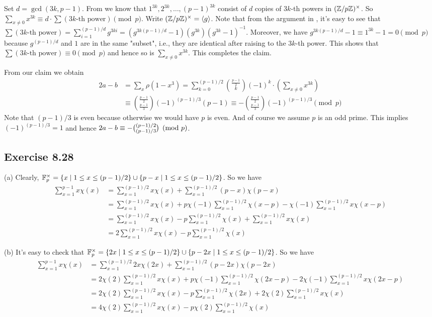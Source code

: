 \documentclass[../I&R.tex]{subfiles}
\begin{document}
Set $d=\gcd(3k,p-1)$. From  we know that $1^{3k},2^{3k},\ldots,(p-1)^{3k}$ consist of $d$ copies of $3k$-th powers in $(\mathbb{Z}/p\mathbb{Z})^\times$. So $\sum_{x\neq0} x^{3k}\equiv d\cdot\sum (3k\text{-th power}) \pmod{p}$. Write $(\mathbb{Z}/p\mathbb{Z})^\times=\langle g\rangle$. Note that from the argument in , it's easy to see that $\sum (3k\text{-th power}) = \sum_{i=1}^{(p-1)/d} g^{3ki} = (g^{3k(p-1)/d}-1)(g^{3k})(g^{3k}-1)^{-1}$. Moreover, we have $g^{3k(p-1)/d}-1\equiv 1^{3k}-1=0\pmod{p}$ because $g^{(p-1)/d}$ and $1$ are in the same "subset", i.e., they are identical after raising to the $3k$-th power. This shows that $\sum (3k\text{-th power}) \equiv0\pmod{p}$ and hence so is $\sum_{x\neq0} x^{3k}$. This completes the claim.

From our claim we obtain
\begin{align*}
    2a-b &= \sum_x \rho(1-x^3) = \sum_{k=0}^{(p-1)/2}\binom{\frac{p-1}{2}}{k}(-1)^k\cdot\left(\sum_{x\neq0} x^{3k}\right) \\
    &\equiv \binom{\frac{p-1}{2}}{\frac{p-1}{3}}(-1)^{(p-1)/3}(p-1) \equiv -\binom{\frac{p-1}{2}}{\frac{p-1}{3}}(-1)^{(p-1)/3} \pmod{p}
\end{align*}
Note that $(p-1)/3$ is even because otherwise we would have $p$ is even. And of course we assume $p$ is an odd prime. This implies $(-1)^{(p-1)/3}=1$ and hence $2a-b\equiv -\tbinom{(p-1)/2}{(p-1)/3} \pmod{p}$.


\subsection*{Exercise 8.28}

(a) Clearly, $\mathbb{F}_p^\times = \{x\mid 1\leq x\leq (p-1)/2\}\cup\{p-x\mid 1\leq x\leq(p-1)/2\}$. So we have
\begin{align*}
    \sum_{x=1}^{p-1} x\chi(x) &= \sum_{x=1}^{(p-1)/2} x\chi(x) + \sum_{x=1}^{(p-1)/2} (p-x)\chi(p-x) \\
    &= \sum_{x=1}^{(p-1)/2} x\chi(x) + p\chi(-1)\sum_{x=1}^{(p-1)/2} \chi(x-p) - \chi(-1)\sum_{x=1}^{(p-1)/2} x\chi(x-p) \\
    &= \sum_{x=1}^{(p-1)/2} x\chi(x) - p\sum_{x=1}^{(p-1)/2} \chi(x) + \sum_{x=1}^{(p-1)/2} x\chi(x) \\
    &= 2\sum_{x=1}^{(p-1)/2} x\chi(x) - p\sum_{x=1}^{(p-1)/2} \chi(x)
\end{align*}

(b) It's easy to check that $\mathbb{F}_p^\times = \{2x\mid 1\leq x\leq (p-1)/2\}\cup\{p-2x\mid 1\leq x\leq(p-1)/2\}$. So we have
\begin{align*}
    \sum_{x=1}^{p-1} x\chi(x) &= \sum_{x=1}^{(p-1)/2} 2x\chi(2x) + \sum_{x=1}^{(p-1)/2} (p-2x)\chi(p-2x) \\
    &= 2\chi(2)\sum_{x=1}^{(p-1)/2} x\chi(x) + p\chi(-1)\sum_{x=1}^{(p-1)/2} \chi(2x-p) - 2\chi(-1)\sum_{x=1}^{(p-1)/2} x\chi(2x-p) \\
    &= 2\chi(2)\sum_{x=1}^{(p-1)/2} x\chi(x) - p\sum_{x=1}^{(p-1)/2} \chi(2x) + 2\chi(2)\sum_{x=1}^{(p-1)/2} x\chi(x) \\
    &= 4\chi(2)\sum_{x=1}^{(p-1)/2} x\chi(x) - p\chi(2)\sum_{x=1}^{(p-1)/2} \chi(x) 
\end{align*}
\end{document}
